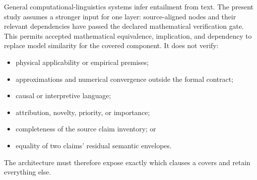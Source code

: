 General computational-linguistics systems infer entailment from text. The present study assumes a stronger input for one layer: source-aligned \MathClaim{} nodes and their relevant dependencies have passed the declared mathematical verification gate. This permits accepted mathematical equivalence, implication, and dependency to replace model similarity for the covered component. It does not verify:
\begin{itemize}
  \item physical applicability or empirical premises;
  \item approximations and numerical convergence outside the formal contract;
  \item causal or interpretive language;
  \item attribution, novelty, priority, or importance;
  \item completeness of the source claim inventory; or
  \item equality of two claims' residual semantic envelopes.
\end{itemize}
The architecture must therefore expose exactly which clauses a \MathClaim{} covers and retain everything else.